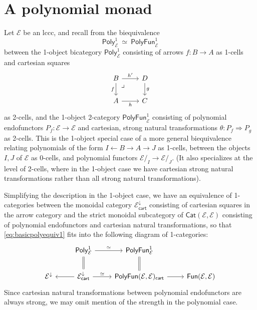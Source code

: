 \documentclass[12pt,reqno]{amsart}
\newcommand{\ednote}[1]{[\textit{\color{red}{#1}}]} %
\newcommand{\DD}{\ensuremath{\mathcal{D}}}
\newcommand{\EE}{\ensuremath{\mathcal{E}}}
\newcommand{\Cat}{\ensuremath{\mathsf{Cat}}}
\newcommand{\alg}[1]{\ensuremath{\mathsf{#1}}}
\renewcommand{\to}{\ensuremath{\rightarrow}}
\renewcommand{\t}{\ensuremath{\mathsf{u}}}
\newcommand{\pbcorner}{\arrow[dr,phantom,"\lrcorner" very near start, shift right=.5ex]} %
\theoremstyle{remark}
\theoremstyle{definition}
\begin{document}
\section{A polynomial monad}\label{sec:Monad}
%
%
%

Let $\EE$ be an lccc, and recall from \cite[Theorem 2.17]{GambinoKoch:2013} the biequivalence 
\begin{equation}\label{eq:basicpolyequiv1}
\mathsf{Poly}^1_{\EE}\ \simeq\ \mathsf{PolyFun}^1_{\EE}
\end{equation}
between the 1-object bicategory $\mathsf{Poly}^1_{\EE}$ consisting of arrows $f:B \to A$ as 1-cells and cartesian squares
\begin{equation}\label{diag:cartsquare}
\begin{tikzcd}
B \ar[d,swap, "f"] \ar[r, "{h'}"] \pbcorner & D \ar[d, "g"] \\
A \ar[r,swap, "{h}"] &  C 
\end{tikzcd}
\end{equation}
as 2-cells, and the 1-object 2-category $\mathsf{PolyFun}^1_{\EE}$ consisting of polynomial endofunctors $P_f: \EE\to \EE$ and cartesian, strong natural transformations $\theta : P_f \Rightarrow P_g$ as 2-cells.  This is the 1-object special case of a more general biequivalence relating polynomials of the form $I \leftarrow B \to A \to J$ as 1-cells, between the objects $I, J$ of $\EE$ as 0-cells, and polynomial functors $\EE/_I \to \EE/_J$. (It also specializes at the level of 2-cells, where in the 1-object case we have cartesian strong natural transformations rather than all strong natural transformations).  

Simplifying the description in the 1-object case, we have an equivalence of 1-categories between the monoidal category $\EE^{\downarrow}_{\mathsf{cart}}$ consisting of cartesian squares in the arrow category and the strict monoidal subcategory of $\Cat(\EE, \EE)$ consisting of polynomial endofunctors and cartesian natural transformations, so that \eqref{eq:basicpolyequiv1} fits into the following diagram of 1-categories:
\begin{equation}\label{diagram:polyandpolyfun}
\begin{tikzcd}
& \mathsf{Poly}^1_{\EE} \ar[d,equals] \ar[r,"{\simeq}"] & \mathsf{PolyFun}^1_{\EE}  \ar[d,equals] &\\
\EE^{\downarrow}  &\EE^{\downarrow}_{\mathsf{cart}} \ar[l] \ar[r,"{\simeq}"] & \mathsf{PolyFun}(\EE, \EE)_{\mathsf{cart}}  \ar[r] & \mathsf{Fun}(\EE, \EE)
\end{tikzcd}
\end{equation}
Since cartesian natural transformations between polynomial endofunctors are always strong, we may omit mention of the strength in the polynomial case.
\end{document}

